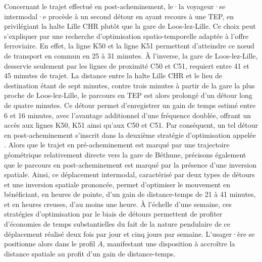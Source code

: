\begin{refsegment}
Concernant le trajet effectué en post-acheminement, le·la voyageur·se intermodal·e procède à un second détour en ayant recours à une \acrshort{TEP}, en privilégiant la halte Lille CHR plutôt que la gare de Loos-lez-Lille. Ce choix peut s'expliquer par une recherche d'optimisation spatio-temporelle adaptée à l'offre ferroviaire. En effet, la ligne K50 et la ligne K51 permettent d'atteindre ce nœud de transport en commun en 25 à 31 minutes. À l'inverse, la gare de Loos-lez-Lille, desservie seulement par les lignes de proximité C50 et C51, requiert entre 41 et 45 minutes de trajet. La distance entre la halte Lille CHR et le lieu de destination étant de sept minutes, contre trois minutes à partir de la gare la plus proche de Loos-lez-Lille, le parcours en \acrshort{TEP} est alors prolongé d'un détour long de quatre minutes. Ce détour permet d'enregistrer un gain de temps estimé entre 6 et 16 minutes, avec l'avantage additionnel d'une fréquence doublée, offrant un accès aux lignes K50, K51 ainsi qu'aux C50 et C51. Par conséquent, un tel détour en post-acheminement s'inscrit dans la deuxième stratégie d'optimisation appelée . Alors que le trajet en pré-acheminement est marqué par une trajectoire géométrique relativement directe vers la gare de Béthune, précisons également que le parcours en post-acheminement est marqué par la présence d'une inversion spatiale. Ainsi, ce déplacement intermodal, caractérisé par deux types de détours et une inversion spatiale prononcée, permet d'optimiser le mouvement en bénéficiant, en heures de pointe, d'un gain de distance-temps de 21 à 41 minutes, et en heures creuses, d'au moins une heure. À l'échelle d'une semaine, ces stratégies d'optimisation par le biais de détours permettent de profiter d'économies de temps substantielles du fait de la nature pendulaire de ce déplacement réalisé deux fois par jour et cinq jours par semaine. L'usager·ère se positionne alors dans le profil \(A\), manifestant une disposition à accroître la distance spatiale au profit d'un gain de distance-temps.%


\end{refsegment}
